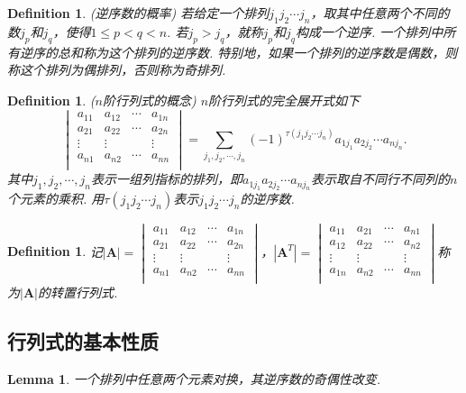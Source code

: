 \documentclass{article}
\newtheorem{lemma}[theorem]{Lemma}
\newtheorem{definition}[theorem]{Definition}
\newcommand{\mbf}[1]{\bm{#1}}
\begin{document}
\begin{definition}
\rm {\color{red} (逆序数的概率)} 若给定一个排列$j_1j_2\cdots j_n$，取其中任意两个不同的数$j_p$和$j_q$，使得$1 \leq p< q <n$. 若$j_p > j_q$，就称$j_p$和$j_q$构成一个{\color{red}逆序}. 一个排列中所有逆序的总和称为这个排列的{\color{red}逆序数}. 特别地，如果一个排列的逆序数是偶数，则称这个排列为{\color{red}偶排列}，否则称为{\color{red}奇排列}.
\end{definition}

\begin{definition}
\rm {\color{red} ($n$阶行列式的概念)} $n$阶行列式的{\color{red}完全展开式}如下
$$
\begin{vmatrix}
a_{11} & a_{12} & \cdots & a_{1n} \\
a_{21} & a_{22} & \cdots & a_{2n} \\
\vdots & \vdots & 		 & \vdots \\
a_{n1} & a_{n2} & \cdots & a_{nn} \\
\end{vmatrix}
=\sum\limits_{j_1,j_2,\cdots,j_n} (-1)^{\tau(j_1j_2\cdots j_n)} a_{1j_1}a_{2j_2}\cdots a_{nj_n}.
$$
其中$j_1,j_2,\cdots,j_n$表示一组列指标的排列，即$a_{1j_1}a_{2j_2}\cdots a_{nj_n}$表示取自不同行不同列的$n$个元素的乘积. 用$\tau(j_1j_2\cdots j_n)$表示$j_1j_2\cdots j_n$的逆序数.  
\end{definition}

\begin{definition}
\rm 记$|\mathbf{A}| = \begin{vmatrix}
a_{11} & a_{12} & \cdots & a_{1n} \\
a_{21} & a_{22} & \cdots & a_{2n} \\
\vdots & \vdots & 		 & \vdots \\
a_{n1} & a_{n2} & \cdots & a_{nn} \\
\end{vmatrix}$，$|\mathbf{A}^T| = \begin{vmatrix}
a_{11} & a_{21} & \cdots & a_{n1} \\
a_{12} & a_{22} & \cdots & a_{n2} \\
\vdots & \vdots & 		 & \vdots \\
a_{1n} & a_{n2} & \cdots & a_{nn} \\
\end{vmatrix}$称为$|\mbf{A}|$的{\color{red}转置行列式}.
\end{definition}

\newpage
\subsection{行列式的基本性质}
\begin{lemma}\label{det: nixu}
\rm 一个排列中任意两个元素对换，其逆序数的奇偶性改变.
\end{lemma}
\end{document}
